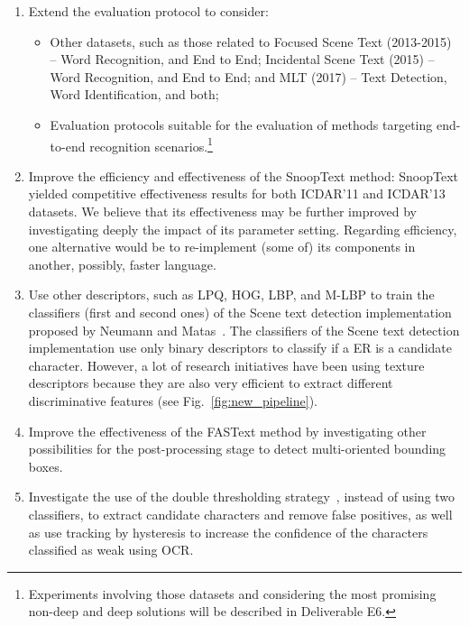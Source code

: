 \begin{enumerate}

    \item Extend the evaluation protocol to consider:
    \begin{itemize}
        \item Other datasets, such as those related to Focused Scene Text (2013-2015) -- Word Recognition, and End to End; Incidental Scene Text (2015) -- Word Recognition, and End to End; and MLT (2017) -- Text Detection, Word Identification, and both;
        \item Evaluation protocols suitable for the evaluation of methods targeting end-to-end recognition scenarios.\footnote{Experiments involving those datasets and considering the most promising non-deep and deep solutions will be described in Deliverable E6.}
    \end{itemize}

    \item Improve the efficiency and effectiveness of the SnoopText method: SnoopText yielded competitive effectiveness results for both ICDAR'11 and ICDAR'13 datasets. We believe that its effectiveness may be further improved by investigating deeply the impact of its parameter setting. Regarding efficiency, one alternative would be to re-implement (some of) its components in another, possibly, faster language.
    
    \item Use other descriptors, such as LPQ, HOG, LBP, and M-LBP to train the classifiers (first and second ones) of the Scene text detection implementation proposed by Neumann and Matas~\cite{Neumann2012CVPR}\cite{Neumann2016TPAMI}. The classifiers of the Scene text detection implementation use only binary descriptors to classify if a ER is a candidate character. However, a lot of research initiatives have been using texture descriptors because they are also very efficient to extract different discriminative features (see Fig.~\ref{fig:new_pipeline}).
    
    \item Improve the effectiveness of the FASText method by investigating other possibilities for the post-processing stage to detect multi-oriented bounding boxes.

    \item Investigate the use of the double thresholding strategy~\cite{Cho2016CVPR}, instead of using two classifiers, to extract candidate characters and remove false positives, as well as use tracking by hysteresis to increase the confidence of the characters classified as weak using OCR.
    

\end{enumerate}
